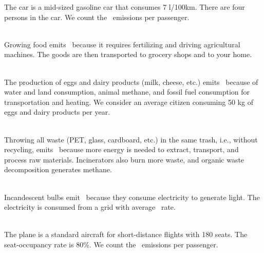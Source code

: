 \begin{enumerateb}
	The car is a mid-sized gasoline car that consumes 7 l/100km.
	There are four persons in the car.
	We count the \COtwo\ emissions per passenger. \\
	\item {} \\
	Growing food emits \COtwo\ because it requires fertilizing and driving agricultural machines.
	The goods are then transported to grocery shops and to your home. \\
	\item {} \\
	The production of eggs and dairy products (milk, cheese, etc.) emits \COtwo\ because of water and land consumption, animal methane, and fossil fuel consumption for transportation and heating.
	We consider an average citizen consuming 50 kg of eggs and dairy products per year. \\
	\item {} \\
	Throwing all waste (PET, glass, cardboard, etc.) in the same trash, i.e., without recycling, emits \COtwo\ because more energy is needed to extract, transport, and process raw materials.
	Incinerators also burn more waste, and organic waste decomposition generates methane. \\
	\item {} \\
	Incandescent bulbs emit \COtwo\ because they consume electricity to generate light.
	The electricity is consumed from a grid with average \COtwo\ rate. \\
	\item {} \\
	The plane is a standard aircraft for short-distance flights with 180 seats.
	The seat-occupancy rate is 80\%.
	We count the \COtwo\ emissions per passenger. \\
	\item {} \\

\end{enumerateb}
